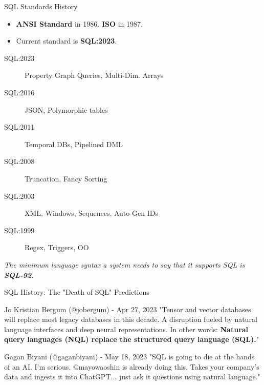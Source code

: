 \documentclass[aspectratio=169]{beamer}
\begin{document}
\begin{frame}{SQL Standards History}
    \begin{itemize}
        \item \textbf{ANSI Standard} in 1986. \textbf{ISO} in 1987.
        \item Current standard is \textbf{SQL:2023}.
    \end{itemize}
    \begin{description}
        \item[SQL:2023] Property Graph Queries, Multi-Dim. Arrays
        \item[SQL:2016] JSON, Polymorphic tables
        \item[SQL:2011] Temporal DBs, Pipelined DML
        \item[SQL:2008] Truncation, Fancy Sorting
        \item[SQL:2003] XML, Windows, Sequences, Auto-Gen IDs
        \item[SQL:1999] Regex, Triggers, OO
    \end{description}
    \vspace{0.2cm}
    \textit{The minimum language syntax a system needs to say that it supports SQL is \textbf{SQL-92}.}
\end{frame}

\begin{frame}{SQL History: The "Death of SQL" Predictions}
    \begin{block}{Jo Kristian Bergum (@jobergum) - Apr 27, 2023}
    "Tensor and vector databases will replace most legacy databases in this decade. A disruption fueled by natural language interfaces and deep neural representations. In other words: \textbf{Natural query languages (NQL) replace the structured query language (SQL).}"
    \end{block}
    
    \begin{block}{Gagan Biyani (@gaganbiyani) - May 18, 2023}
    "SQL is going to die at the hands of an AI. I'm serious. @mayowaoshin is already doing this. Takes your company's data and ingests it into ChatGPT... just ask it questions using natural language."
    \end{block}
\end{frame}
\end{document}
